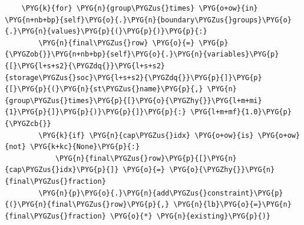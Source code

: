 \begin{Verbatim}
    \PYG{k}{for} \PYG{n}{group\PYGZus{}times} \PYG{o+ow}{in} \PYG{n+nb+bp}{self}\PYG{o}{.}\PYG{n}{boundary\PYGZus{}groups}\PYG{o}{.}\PYG{n}{values}\PYG{p}{(}\PYG{p}{)}\PYG{p}{:}
        \PYG{n}{final\PYGZus{}row} \PYG{o}{=} \PYG{p}{\PYGZob{}}\PYG{n+nb+bp}{self}\PYG{o}{.}\PYG{n}{variables}\PYG{p}{[}\PYG{l+s+s2}{\PYGZdq{}}\PYG{l+s+s2}{storage\PYGZus{}soc}\PYG{l+s+s2}{\PYGZdq{}}\PYG{p}{]}\PYG{p}{[}\PYG{p}{(}\PYG{n}{st\PYGZus{}name}\PYG{p}{,} \PYG{n}{group\PYGZus{}times}\PYG{p}{[}\PYG{o}{\PYGZhy{}}\PYG{l+m+mi}{1}\PYG{p}{]}\PYG{p}{)}\PYG{p}{]}\PYG{p}{:} \PYG{l+m+mf}{1.0}\PYG{p}{\PYGZcb{}}
        \PYG{k}{if} \PYG{n}{cap\PYGZus{}idx} \PYG{o+ow}{is} \PYG{o+ow}{not} \PYG{k+kc}{None}\PYG{p}{:}
            \PYG{n}{final\PYGZus{}row}\PYG{p}{[}\PYG{n}{cap\PYGZus{}idx}\PYG{p}{]} \PYG{o}{=} \PYG{o}{\PYGZhy{}}\PYG{n}{final\PYGZus{}fraction}
        \PYG{n}{p}\PYG{o}{.}\PYG{n}{add\PYGZus{}constraint}\PYG{p}{(}\PYG{n}{final\PYGZus{}row}\PYG{p}{,} \PYG{n}{lb}\PYG{o}{=}\PYG{n}{final\PYGZus{}fraction} \PYG{o}{*} \PYG{n}{existing}\PYG{p}{)}
\end{Verbatim}
